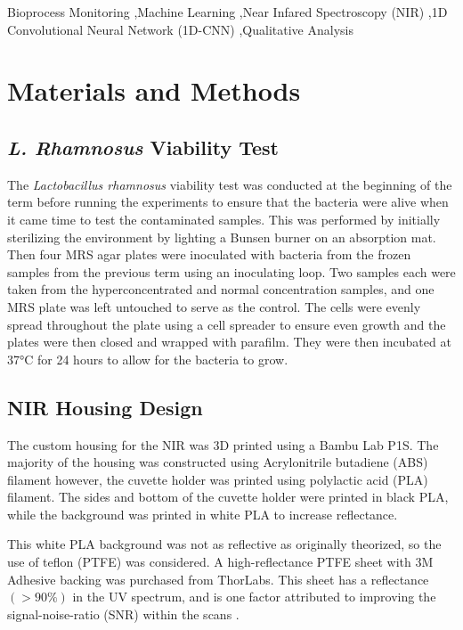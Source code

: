 \documentclass[final, 3p, 11pt]{elsarticle}
\begin{document}
\begin{frontmatter}
\begin{abstract}
\end{abstract}

\begin{keyword}
Bioprocess Monitoring \sep Machine Learning \sep Near Infared Spectroscopy (NIR) \sep 1D Convolutional Neural Network (1D-CNN) \sep Qualitative Analysis
\end{keyword}

\end{frontmatter}


\section{Materials and Methods}

\subsection{\textit{L. Rhamnosus} Viability Test}
The \textit{Lactobacillus rhamnosus} viability test was conducted at the beginning of the term before running the experiments to ensure that the bacteria were alive when it came time to test the contaminated samples. This was performed by initially sterilizing the environment by lighting a Bunsen burner on an absorption mat. Then four MRS agar plates were inoculated with bacteria from the frozen samples from the previous term using an inoculating loop. Two samples each were taken from the hyperconcentrated and normal concentration samples, and one MRS plate was left untouched to serve as the control. The cells were evenly spread throughout the plate using a cell spreader to ensure even growth and the plates were then closed and wrapped with parafilm. They were then incubated at 37°C for 24 hours to allow for the bacteria to grow. 

\subsection{NIR Housing Design}
The custom housing for the NIR was 3D printed using a Bambu Lab P1S. The majority of the housing was constructed using Acrylonitrile butadiene (ABS) filament however, the cuvette holder was printed using polylactic acid (PLA) filament. The sides and bottom of the cuvette holder were printed in black PLA, while the background was printed in white PLA to increase reflectance. 

This white PLA background was not as reflective as originally theorized, so the use of teflon (PTFE) was considered. A high-reflectance PTFE sheet with 3M Adhesive backing was purchased from ThorLabs. This sheet has a reflectance $( >90\%)$ in the UV spectrum, and is one factor attributed to improving the signal-noise-ratio (SNR) within the scans \citep{HighReflectancePTFESheets}.
\end{document}
